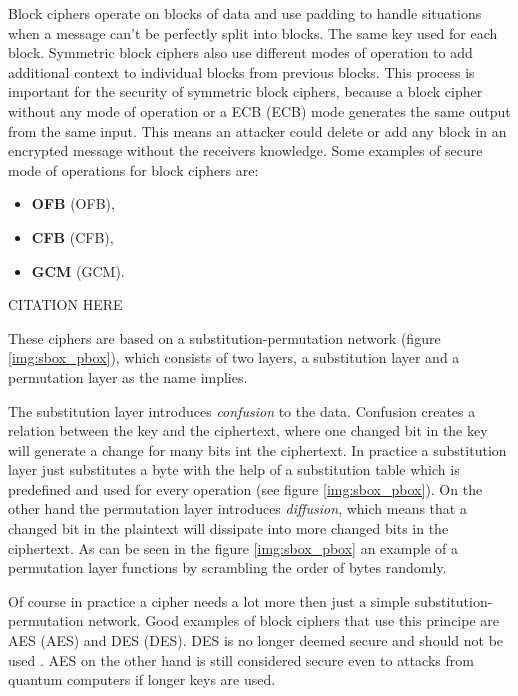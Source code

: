 Block ciphers operate on blocks of data and use padding to handle situations when a message can't be perfectly split into blocks. The same key used for each block. Symmetric block ciphers also use different modes of operation to add additional context to individual blocks from previous blocks. This process is important for the security of symmetric block ciphers, because a block cipher without any mode of operation or a ECB (\acl{ECB}) mode generates the same output from the same input. This means an attacker could delete or add any block in an encrypted message without the receivers knowledge. Some examples of secure mode of operations for block ciphers are:
\begin{itemize}
  \item \textbf{OFB} (\acl{OFB}),
  \item \textbf{CFB} (\acl{CFB}),
  \item \textbf{GCM} (\acl{GCM}).
\end{itemize}

CITATION HERE

These ciphers are based on a substitution-permutation network (figure \ref{img:sbox_pbox}), which consists of two layers, a substitution layer and a permutation layer as the name implies. 

The substitution layer introduces \textit{confusion} to the data. Confusion creates a relation between the key and the ciphertext, where one changed bit in the key will generate a change for many bits int the ciphertext. In practice a substitution layer just substitutes a byte with the help of a substitution table which is predefined and used for every operation (see figure \ref{img:sbox_pbox}). On the other hand the permutation layer introduces \textit{diffusion}, which means that a changed bit in the plaintext will dissipate into more changed bits in the ciphertext. As can be seen in the figure \ref{img:sbox_pbox} an example of a permutation layer functions by scrambling the order of bytes randomly. \cite{Paar2010}\cite{Shannon1949}

Of course in practice a cipher needs a lot more then just a simple substitution-permutation network. Good examples of block ciphers that use this principe are AES (\acl{AES}) and DES (\acl{DES}). DES is no longer deemed secure and should not be used \cite{Barker2017}. AES on the other hand is still considered secure even to attacks from quantum computers if longer keys are used\cite{Chen2016}.

